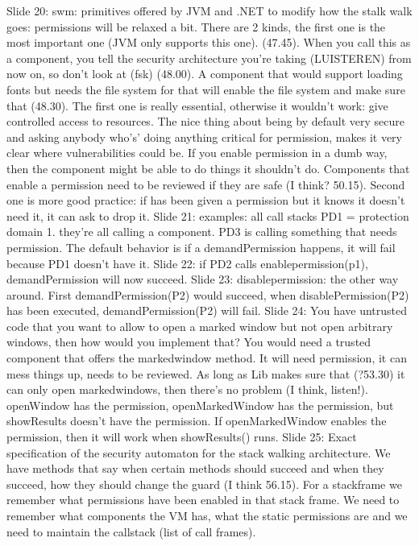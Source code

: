 \documentclass[10pt,a4paper]{report}
\begin{document}
Slide 20: swm: primitives offered by JVM and .NET to modify how the stalk walk goes: permissions will be relaxed a bit. There are 2 kinds, the first one is the most important one (JVM only supports this one). (47.45). When you call this as a component, you tell the security architecture you're taking (LUISTEREN) from now on, so don't look at (fsk) (48.00). A component that would support loading fonts but needs the file system for that will enable the file system and make sure that (48.30).
The first one is really essential, otherwise it wouldn't work: give controlled access to resources. 
The nice thing about being by default very secure and asking anybody who's' doing anything critical for permission, makes it very clear where vulnerabilities could be. If you enable permission in a dumb way, then the component might be able to do things it shouldn't do. 
Components that enable a permission need to be reviewed if they are safe (I think? 50.15).
Second one is more good practice: if has been given a permission but it knows it doesn't need it, it can ask to drop it. 
Slide 21: examples: all call stacks PD1 = protection domain 1. they're all calling a component. PD3 is calling something that needs permission.
The default behavior is if a demandPermission happens, it will fail because PD1 doesn't have it.
Slide 22: if PD2 calls enablepermission(p1), demandPermission will now succeed.
Slide 23: disablepermission: the other way around. First demandPermission(P2) would succeed, when disablePermission(P2) has been executed, demandPermission(P2) will fail.
Slide 24: You have untrusted code that you want to allow to open a marked window but not open arbitrary windows, then how would you implement that? You would need a trusted component that offers the markedwindow method. It will need permission, it can mess things up, needs to be reviewed. As long as Lib makes sure that (?53.30) it can only open markedwindows, then there's no problem (I think, listen!).
openWindow has the permission, openMarkedWindow has the permission, but showResults doesn't have the permission. If openMarkedWindow enables the permission, then it will work when showResults() runs. 
Slide 25: Exact specification of the security automaton for the stack walking architecture. We have methods that say when certain methods should succeed and when they succeed, how they should change the guard (I think 56.15).
For a stackframe we remember what permissions have been enabled in that stack frame.
We need to remember what components the VM has, what the static permissions are and we need to maintain the callstack (list of call frames).
\end{document}
